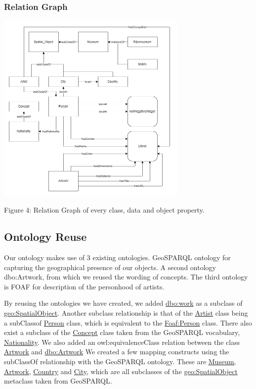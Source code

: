 \documentclass{article}
\begin{document}
\begin{center}
\subsubsection{Relation Graph}
\includegraphics[width=350]{Relation_Graph.png}
\newline
\caption{Figure 4: Relation Graph of every class, data and object property.}
\end{center}


\newpage
\subsection{Ontology Reuse}
Our ontology makes use of 3 existing ontologies. GeoSPARQL ontology for capturing the geographical presence of our objects. A second ontology dbo:Artwork, from which we reused the wording of concepts. The third ontology is FOAF for description of the personhood of artists.

By reusing the ontologies we have created, we added \underline{dbo:work} as a subclass of \underline{geo:SpatialObject}. Another subclass relationship is that of the \underline{Artist} class being a subClassof \underline{Person} class, which is equivalent to the \underline{Foaf:Person} class. There also exist a subclass of the \underline{Concept} class taken from the GeoSPARQL vocabulary, \underline{Nationality}. We also added an owl:equivalenceClass relation between the class \underline{Artwork} and \underline{dbo:Artwork}
We created a few mapping constructs using the subClassOf relationship with the GeoSPARQL ontology. These are \underline{Museum}, \underline{Artwork},
\underline{Country} and \underline{City}, which are all subclasses of the \underline{geo:SpatialObject} metaclass taken from
GeoSPARQL. 
\end{document}
